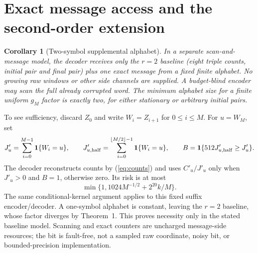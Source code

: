 \documentclass[10pt]{article}
\newtheorem{corollary}[theorem]{Corollary}
\newcommand{\ind}{\mathbf1}
\begin{document}
\section{Exact message access and the second-order extension}
\begin{corollary}[Two-symbol supplemental alphabet]
In a separate scan-and-message model, the decoder receives \emph{only} the $r=2$ baseline (eight triple counts, initial pair and final pair) plus one exact message from a fixed finite alphabet. No growing raw windows or other side channels are supplied. A budget-blind encoder may scan the full already corrupted word. The minimum alphabet size for a finite uniform $g_M$ factor is exactly two, for either stationary or arbitrary initial pairs.
\end{corollary}
To see sufficiency, discard $Z_0$ and write $W_i=Z_{i+1}$ for $0\le i\le M$. For $u=W_M$, set
\[
 J'_u=\sum_{i=0}^{M-1}\ind\{W_i=u\},\qquad
 J'_{u,\rm half}=\sum_{i=0}^{\lfloor M/2\rfloor-1}\ind\{W_i=u\},\qquad
 B=\ind\{512J'_{u,\rm half}\ge J'_u\}.
\]
The decoder reconstructs counts by (\ref{eq:counts}) and uses $C'_u/J'_u$ only when $J'_u>0$ and $B=1$, otherwise zero. Its risk is at most
\[
 \min\{1,1024M^{-1/2}+2^{20}k/M\}.
\]
The same conditional-kernel argument applies to this fixed suffix encoder/decoder. A one-symbol alphabet is constant, leaving the $r=2$ baseline, whose factor diverges by Theorem~1. This proves necessity only in the stated baseline model. Scanning and exact counters are uncharged message-side resources; the bit is fault-free, not a sampled raw coordinate, noisy bit, or bounded-precision implementation.
\end{document}
